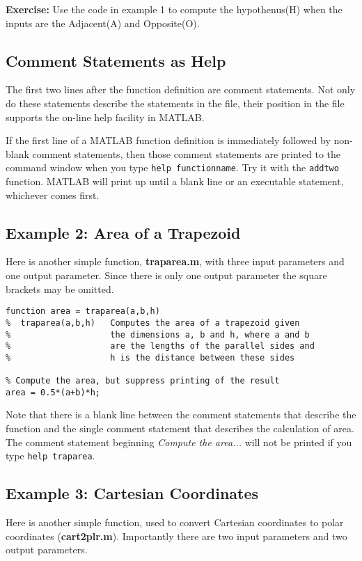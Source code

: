 \documentclass[a4paper,12pt]{article}
\begin{document}
\textbf{Exercise:} Use the code in example 1 to compute the hypothenus(H) when the inputs are the Adjacent(A) and Opposite(O).


\subsection{Comment Statements as Help}

The first two lines after the function definition are comment statements. Not only do these statements describe the statements in the file, their position in the file supports the on-line help facility in MATLAB. 

If the first line of a MATLAB function definition is immediately followed by non-blank comment statements, then those comment statements are printed to the command window when you type \texttt{help functionname}. Try it with the \texttt{addtwo} function. MATLAB will print up until a blank line or an executable statement, whichever comes first. 

\subsection{Example 2: Area of a Trapezoid}

Here is another simple function, \textbf{traparea.m}, with three input parameters and one output parameter. Since there is only one output parameter the square brackets may be omitted.


\begin{framed}
\begin{verbatim}
function area = traparea(a,b,h)
%  traparea(a,b,h)   Computes the area of a trapezoid given
%                    the dimensions a, b and h, where a and b
%                    are the lengths of the parallel sides and
%                    h is the distance between these sides

% Compute the area, but suppress printing of the result
area = 0.5*(a+b)*h;
\end{verbatim}
\end{framed}

Note that there is a blank line between the comment statements that describe the function and the single comment statement that describes the calculation of area. The comment statement beginning \textit{Compute the area...} will not be printed if you type \texttt{help traparea}.

\subsection{Example 3: Cartesian Coordinates}
Here is another simple function, used to convert Cartesian coordinates to polar coordinates (\textbf{cart2plr.m}). Importantly there are two input parameters and two output parameters. 
\end{document}
